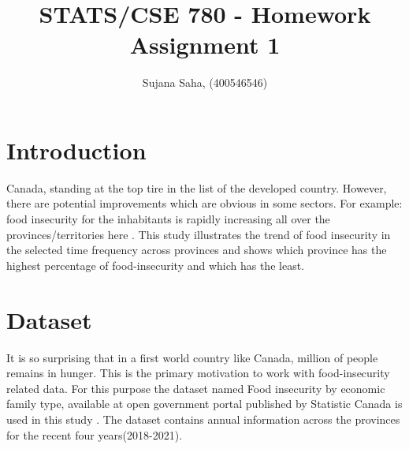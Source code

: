\documentclass[11pt]{article}
\title{STATS/CSE 780 - Homework Assignment 1}
\author{Sujana Saha,   (400546546)}
\newcommand{\bc}{\color{black}}
\newcommand{\blc}{\color{blue}}
\newcommand{\mX}{\mbox{\textbf{X}}}
\begin{document}
\maketitle
\newpage

	





\section{Introduction}
Canada, standing at the top tire in the list of the developed country. However, there are potential improvements which are obvious in some sectors. For example: food insecurity for the inhabitants is rapidly increasing all over the provinces/territories here \cite{utoronto}. This study illustrates the trend of food insecurity in the selected time frequency across provinces and shows which province has the highest percentage of food-insecurity and which has the least.

\section{Dataset}
It is so surprising that in a first world country like Canada, million of people remains in hunger. This is the primary motivation to work with food-insecurity related data. For this purpose the dataset named Food insecurity by economic family type, available at open government portal published by Statistic Canada is used in this study \cite{dataset}. The dataset contains annual information across the provinces for the recent four years(2018-2021). 
\end{document}

